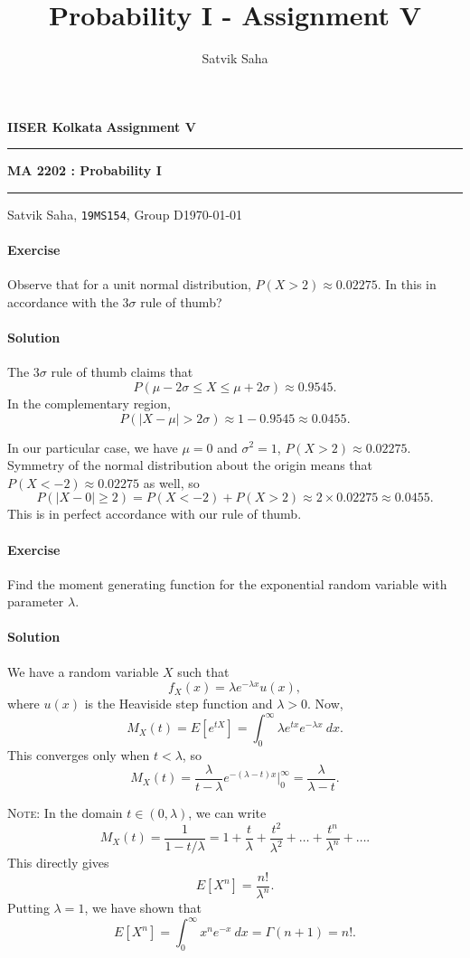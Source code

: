 \documentclass[10pt]{article}
\title{Probability I - Assignment V}
\author{Satvik Saha}
\date{}
\newcounter{prob}
\def\problem{\stepcounter{prob}\paragraph{Exercise \arabic{prob}}}
\def\solution{\paragraph{Solution}}
\newcommand\E[1]{E[#1]}
\begin{document}
        \par\textbf{IISER Kolkata} \hfill \textbf{Assignment V}
        \vspace{3pt}
        \hrule
        \vspace{3pt}
        \begin{center}
                \LARGE{\textbf{MA 2202 : Probability I}}
        \end{center}
        \vspace{3pt}
        \hrule
        \vspace{3pt}
        Satvik Saha, \texttt{19MS154}, Group D\hfill\today
        \vspace{20pt}

        \problem Observe that for a unit normal distribution, $P(X > 2) \approx
        0.02275$. In this in accordance with the $3\sigma$ rule of thumb?

        \solution The $3\sigma$ rule of thumb claims that \[
            P(\mu - 2\sigma \leq X \leq \mu + 2\sigma) \approx 0.9545.
        \] In the complementary region, \[
            P(|X - \mu| > 2\sigma) \approx 1 - 0.9545 \approx 0.0455.
        \] 

        In our particular case, we have $\mu = 0$ and $\sigma^2 = 1$, $P(X > 2)
        \approx 0.02275$. Symmetry of the normal distribution about the origin means
        that $P(X < -2) \approx 0.02275$ as well, so \[
            P(|X - 0| \geq 2) = P(X < -2) + P(X > 2) \approx 2\times 0.02275
            \approx 0.0455.
        \] This is in perfect accordance with our rule of thumb.

        \problem Find the moment generating function for the exponential random
        variable with parameter $\lambda$.

        \solution We have a random variable $X$ such that \[
            f_X(x) = \lambda e^{-\lambda x}u(x),
        \] where $u(x)$ is the Heaviside step function and $\lambda > 0$. Now, \[
            M_X(t) = \E{e^{tX}} = \int_0^\infty \lambda e^{tx}e^{-\lambda x}\:dx.
        \] This converges only when $t < \lambda$, so \[
            M_X(t) = \frac{\lambda}{t - \lambda}e^{-(\lambda - t)x}\Big|_0^\infty =
            \frac{\lambda}{\lambda - t}.
        \] 

        \textsc{Note:} In the domain $t \in (0, \lambda)$, we can write \[
            M_X(t) = \frac{1}{1 - t / \lambda} = 1 + \frac{t}{\lambda} +
            \frac{t^2}{\lambda^2} + \dots + \frac{t^n}{\lambda^n} + \dots.
        \] This directly gives \[
            \E{X^n} = \frac{n!}{\lambda^n}.
        \] Putting $\lambda = 1$, we have shown that \[
            \E{X^n} = \int_0^\infty x^n e^{-x}\:dx = \Gamma(n + 1) = n!.
        \] 
\end{document}
